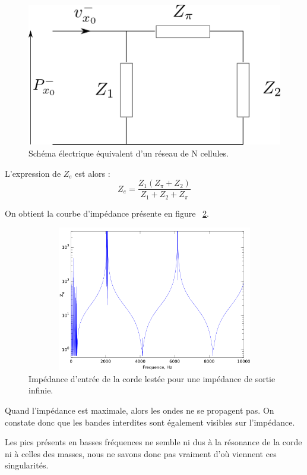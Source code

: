 \documentclass[a4paper,11pt]{report} %
\begin{document}
\begin{figure}[!h]
	\centering
	\includegraphics[scale=0.5]{./figures/schema_elec_impedance.png}
	\caption{Schéma électrique équivalent d'un réseau de N cellules.}
	\label{pi}
\end{figure}

L'expression de $Z_{e}$ est alors : 
\begin{equation*}
Z_{e} = \frac{Z_{1}(Z_{\pi}+Z_2)}{Z_1+Z_2+Z_{\pi}}
\end{equation*}
 
On obtient la courbe d'impédance présente en figure ~\ref{imp}.

\begin{figure}[!h]\centering
\includegraphics[width=330pt,height = 180pt]{./figures/impedance_entree.png}
\caption{Impédance d'entrée de la corde lestée pour une impédance de sortie infinie.}
\label{imp}
\end{figure}

\bigskip
Quand l'impédance est maximale, alors les ondes ne se propagent pas. On constate donc que les bandes interdites sont également visibles sur l'impédance.

Les pics présents en basses fréquences ne semble ni dus à la résonance de la corde ni à celles des masses, nous ne savons donc pas vraiment d'où viennent ces singularités.
\end{document}
